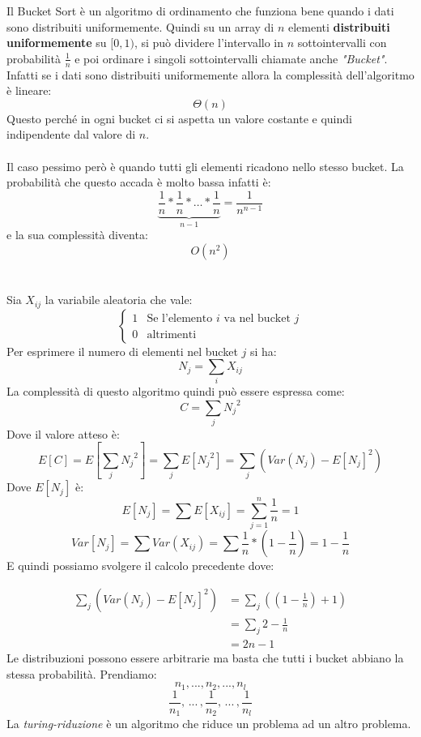 \documentclass[a4paper]{article}
\begin{document}
Il Bucket Sort è un algoritmo di ordinamento che funziona bene quando i dati sono distribuiti uniformemente. Quindi
su un array di $n$ elementi \textbf{distribuiti uniformemente} su $[0, 1)$, si può dividere l'intervallo in $n$ sottointervalli
con probabilità $\frac{1}{n}$ e poi ordinare i singoli sottointervalli chiamate anche \textit{"Bucket"}. 
Infatti se i dati sono distribuiti uniformemente allora la complessità dell'algoritmo è lineare: \[\Theta(n)\]Questo
perché in ogni bucket ci si aspetta un valore costante e quindi indipendente dal valore di $n$.
\\\\Il caso pessimo però è quando tutti gli elementi ricadono nello stesso bucket. La probabilità che questo accada è molto bassa
infatti è: \[\underbrace{\frac{1}{n} \ast \frac{1}{n} \ast \dots \ast \frac{1}{n}}_{n-1}  = \frac{1}{n^{n-1}}\]e la sua complessità diventa: \[O(n^2)\]
\\\\
Sia \(X_{ij}\) la variabile aleatoria che vale:
\[
\begin{cases}
  1 & \text{Se l'elemento } i \text{ va nel bucket } j\\
  0 & \text{altrimenti}
\end{cases}
\]
Per esprimere il numero di elementi nel bucket $j$ si ha:
\[
  N_j = \sum_{i} X_{ij}
\]
La complessità di questo algoritmo quindi può essere espressa come:
\[
  C = \sum_j {N_j}^2
\]
Dove il valore atteso è:
\[E[C] = E\left[ \sum_j {N_j}^2\right] = \sum_j E[{N_j}^2] = \sum_j\left(Var(N_j) - E[N_j]^2\right)\]
Dove $E[N_j]$ è:
\[E[N_j] = \sum E[X_{ij}] = \sum_{j=1}^n \frac{1}{n} = 1\]
\[Var[N_j] = \sum Var(X_{ij}) = \sum \frac{1}{n} * \left(1 - \frac{1}{n}\right) = 1 - \frac{1}{n}\]
E quindi possiamo svolgere il calcolo precedente dove: 

\begin{align*}
  \sum_j \left(Var(N_j) - E[N_j]^2\right) &=  \sum_j \left(\left(1 - \frac{1}{n}\right) + 1\right) \\ &= \sum_j 2 - \frac{1}{n}\\  &= 2n - 1
\end{align*}
Le distribuzioni possono essere arbitrarie ma basta che tutti i bucket abbiano la stessa probabilità.
Prendiamo:
\[n_1, ..., n_2, ... , n_l\]
\[\frac{1}{n_1}, \, ... \,  , \frac{1}{n_2}, \, ... \, , \frac{1}{n_l}\]
La \textit{turing-riduzione} è un algoritmo che riduce un problema ad un altro problema. 
\end{document}
